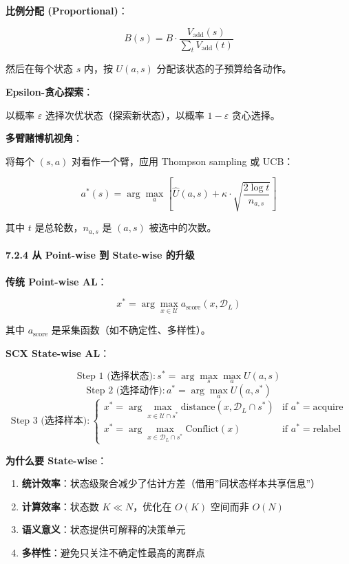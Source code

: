 \documentclass[
  12pt,
]{ctexart}
\providecommand{\tightlist}{%
  \setlength{\itemsep}{0pt}\setlength{\parskip}{0pt}}
\begin{document}
\textbf{比例分配 (Proportional)}：

\[
B(s) = B \cdot \frac{V_{\text{add}}(s)}{\sum_{t} V_{\text{add}}(t)}
\]

然后在每个状态 \(s\) 内，按 \(U(a,s)\) 分配该状态的子预算给各动作。

\textbf{Epsilon-贪心探索}：

以概率 \(\varepsilon\) 选择次优状态（探索新状态），以概率
\(1-\varepsilon\) 贪心选择。

\textbf{多臂赌博机视角}：

将每个 \((s,a)\) 对看作一个臂，应用 Thompson sampling 或 UCB：

\[
a^*(s) = \arg\max_a \left[ \hat{U}(a,s) + \kappa \cdot \sqrt{\frac{2 \log t}{n_{a,s}}} \right]
\]

其中 \(t\) 是总轮数，\(n_{a,s}\) 是 \((a,s)\) 被选中的次数。

\paragraph{7.2.4 从 Point-wise 到 State-wise
的升级}\label{ux4ece-point-wise-ux5230-state-wise-ux7684ux5347ux7ea7}

\textbf{传统 Point-wise AL}：

\[
x^* = \arg\max_{x \in \mathcal{U}} a_{\text{score}}(x, \mathcal{D}_L)
\]

其中 \(a_{\text{score}}\) 是采集函数（如不确定性、多样性）。

\textbf{SCX State-wise AL}：

\[
\text{Step 1 (选择状态)}: s^* = \arg\max_s \max_a U(a,s)
\] \[
\text{Step 2 (选择动作)}: a^* = \arg\max_a U(a, s^*)
\] \[
\text{Step 3 (选择样本)}: 
\begin{cases}
x^* = \arg\max_{x \in \mathcal{U} \cap s^*} \text{distance}(x, \mathcal{D}_L \cap s^*) & \text{if } a^* = \text{acquire} \\
x^* = \arg\max_{x \in \mathcal{D}_L \cap s^*} \text{Conflict}(x) & \text{if } a^* = \text{relabel}
\end{cases}
\]

\textbf{为什么要 State-wise}：

\begin{enumerate}
\def\labelenumi{\arabic{enumi}.}
\tightlist
\item
  \textbf{统计效率}：状态级聚合减少了估计方差（借用''同状态样本共享信息''）
\item
  \textbf{计算效率}：状态数 \(K \ll N\)，优化在 \(O(K)\) 空间而非
  \(O(N)\)
\item
  \textbf{语义意义}：状态提供可解释的决策单元
\item
  \textbf{多样性}：避免只关注不确定性最高的离群点
\end{enumerate}
\end{document}

